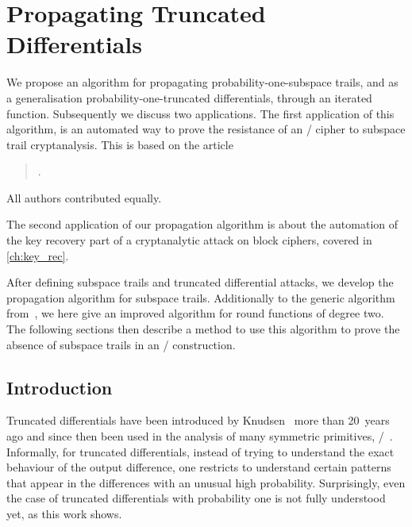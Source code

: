\chapter{Propagating Truncated Differentials}\label{ch:st}

\vspace*{-\baselineskip}
\hspace{1.5em}
We propose an algorithm for propagating probability-one-subspace trails, and as a generalisation probability-one-truncated differentials, through an iterated function.
Subsequently we discuss two applications.
The first application of this algorithm, is an automated way to prove the resistance of an \SPN/ cipher to subspace trail cryptanalysis.
This is based on the article
\begin{quote}
    .
\end{quote}
All authors contributed equally.

The second application of our propagation algorithm is about the automation of the key recovery part of a cryptanalytic attack on block ciphers, covered in \cref{ch:key_rec}.

After defining subspace trails and truncated differential attacks, we develop the propagation algorithm for subspace trails.
Additionally to the generic algorithm from~\cite{ToSC:LeaTezWie18}, we here give an improved algorithm for round functions of degree two.
The following sections then describe a method to use this algorithm to prove the absence of subspace trails in an \SPN/ construction.

\section{Introduction}

Truncated differentials have been introduced by Knudsen~\cite{FSE:Knudsen94} more than 20~years ago and since then been used in the analysis of many symmetric primitives, \eg/~.
Informally, for truncated differentials, instead of trying to understand the exact behaviour of the output difference, one restricts to understand certain patterns that appear in the differences with an unusual high probability.
Surprisingly, even the case of truncated differentials with probability one is not fully understood yet, as this work shows.

